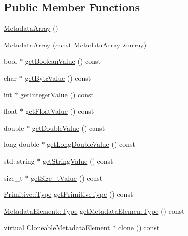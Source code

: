 \subsection*{Public Member Functions}
\begin{DoxyCompactItemize}
\item 
\hyperlink{classBUSBOY_1_1MetadataArray_ad85416de99d6286fe5cf0b45cfa2d491}{MetadataArray} ()
\item 
\hyperlink{classBUSBOY_1_1MetadataArray_ae7d919f8a59c20888ab92e5fcfe52eb5}{MetadataArray} (const \hyperlink{classBUSBOY_1_1MetadataArray}{MetadataArray} \&array)
\item 
bool $\ast$ \hyperlink{classBUSBOY_1_1MetadataArray_a314eab0a563dbca2f312c20d0a2e5568}{getBooleanValue} () const 
\item 
char $\ast$ \hyperlink{classBUSBOY_1_1MetadataArray_a10840e6a5a0cbfbcca61018e2f682e07}{getByteValue} () const 
\item 
int $\ast$ \hyperlink{classBUSBOY_1_1MetadataArray_a1ae06cfee955bd447843cdfc298b76d7}{getIntegerValue} () const 
\item 
float $\ast$ \hyperlink{classBUSBOY_1_1MetadataArray_a3668eb3c0fb08d7e068d9649100be819}{getFloatValue} () const 
\item 
double $\ast$ \hyperlink{classBUSBOY_1_1MetadataArray_a23ceda933467b3a4859b6981d83c3801}{getDoubleValue} () const 
\item 
long double $\ast$ \hyperlink{classBUSBOY_1_1MetadataArray_ad0379652fdd47dc55e097db4e3cfe957}{getLongDoubleValue} () const 
\item 
std::string $\ast$ \hyperlink{classBUSBOY_1_1MetadataArray_a2ec7ef059e89030606d9090af71d7a11}{getStringValue} () const 
\item 
size\_\-t $\ast$ \hyperlink{classBUSBOY_1_1MetadataArray_a6a0594d8b1cda2669e312e22bc0d3c99}{getSize\_\-tValue} () const 
\item 
\hyperlink{classBUSBOY_1_1Primitive_afa08dc3cc68d2e851adafb0fc492cf15}{Primitive::Type} \hyperlink{classBUSBOY_1_1MetadataArray_ad3d9b5a9ad0f22ff32b31db7213117de}{getPrimitiveType} () const 
\item 
\hyperlink{classBUSBOY_1_1MetadataElement_ab66bf575c7d26f857a2871d42bd97d12}{MetadataElement::Type} \hyperlink{classBUSBOY_1_1MetadataArray_af8706944f1dd70088aca6edfa0b9b4dd}{getMetadataElementType} () const 
\item 
virtual \hyperlink{classBUSBOY_1_1CloneableMetadataElement}{CloneableMetadataElement} $\ast$ \hyperlink{classBUSBOY_1_1MetadataArray_ad7a804d6e13ada7283e23b9e91e3b699}{clone} () const 

\end{DoxyCompactItemize}
